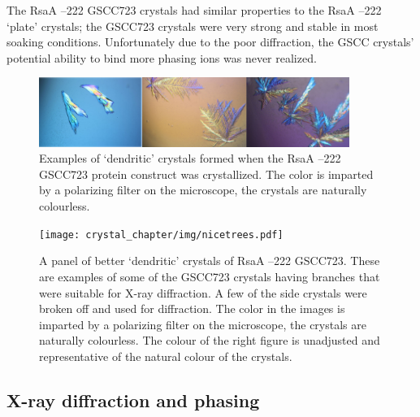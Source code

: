 The RsaA --222 GSCC723 crystals had similar properties to the RsaA --222 `plate' crystals; the GSCC723 crystals were very strong and stable in most soaking conditions. Unfortunately due to the poor diffraction, the GSCC crystals' potential ability to bind more phasing ions was never realized.

\begin{figure}[p]
  	\begin{center}
   		\includegraphics[width=0.9\textwidth]{crystal_chapter/img/dendroXtals.jpg}
   	\end{center}
   	\caption[Examples of unusable `dendritic' RsaA --222 GSCC723 crystals]{Examples of `dendritic' crystals formed when the RsaA --222 GSCC723 protein construct was crystallized. The color is imparted by a polarizing filter on the microscope, the crystals are naturally colourless.}
   	\label{fig:crystal-dendrites}
\end{figure}

\begin{figure}[p]
  	\begin{center}
   		\texttt{[image: crystal\_chapter/img/nicetrees.pdf]}
   	\end{center}
   	\caption[`Dendritic' RsaA --222 GSCC723 crystals that were used for X-ray diffraction]{A panel of better `dendritic' crystals of RsaA --222 GSCC723. These are examples of some of the GSCC723 crystals having branches that were suitable for X-ray diffraction. A few of the side crystals were broken off and used for diffraction.  The color in the images is imparted by a polarizing filter on the microscope, the crystals are naturally colourless. The colour of the right figure is unadjusted and representative of the natural colour of the crystals.}
   	\label{fig:nice-trees}
\end{figure}   

\subsection{X-ray diffraction and phasing}\label{sec:x-ray-diffraction}

